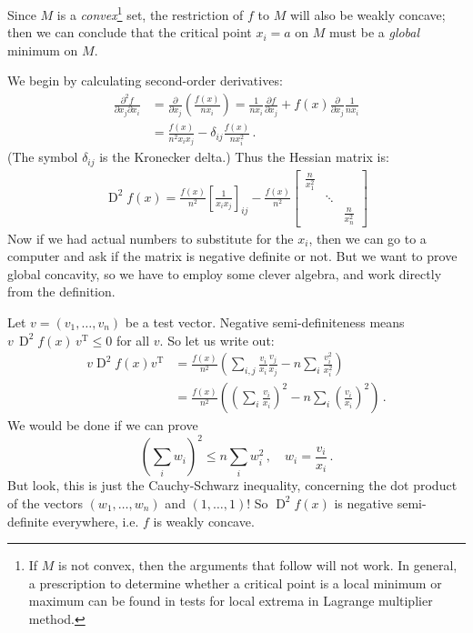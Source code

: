 \documentclass[12pt]{article}
\DeclareMathOperator{\D}{D}
\begin{document}
Since $M$ is a \emph{convex}\footnote{
If $M$ is not convex, then the arguments that follow will not work.
In general, a prescription to determine whether a critical point
is a local minimum or maximum can be found
in tests for local extrema in Lagrange multiplier method.} set, the restriction
of $f$ to $M$ will also be weakly concave;
then we can conclude that
the critical point $x_i = a$ on $M$
must be a \emph{global} minimum on $M$.

We begin by calculating second-order derivatives:
\begin{align*}
\frac{\partial^2 f}{\partial x_j \partial x_i} &= \frac{\partial}{\partial x_j} \left( \frac{f(x)}{nx_i} \right) 
=
\frac{1}{nx_i} \frac{\partial f}{\partial x_j} + f(x) \frac{\partial}{\partial x_j} \frac{1}{nx_i} \\
&= \frac{f(x)}{n^2 x_i x_j} - \delta_{ij} \frac{f(x)}{n x_i^2}\,.
\end{align*}
(The symbol $\delta_{ij}$ is the Kronecker delta.)
Thus the Hessian matrix is:
\begin{align*}
\D^2 f(x) = \frac{f(x)}{n^2} \left[ \frac{1}{x_i x_j} \right]_{ij} - \frac{f(x)}{n^2} 
\begin{bmatrix}
\frac{n}{x_1^2} \\
& \ddots \\
& & \frac{n}{x_n^2}
\end{bmatrix}
\end{align*}
Now if we had actual numbers to substitute for the $x_i$,
then we can go to a computer and ask if the matrix is negative definite or not.
But we want to prove global concavity, so we have to employ some clever
algebra, and work directly from the definition.

Let $v = (v_1, \dotsc, v_n)$ be a test vector.
Negative semi-definiteness means $v \, \D^2 f(x) \, v^{\mathrm{T}} \leq 0$ for all $v$.
So let us write out:
\begin{align*}
v \D^2 f(x) v^{\mathrm{T}} &= \frac{f(x)}{n^2} \left( \sum_{i,j} \frac{v_i}{x_i} \frac{v_j}{x_j} - n \sum_i \frac{v_i^2}{x_i^2} \right) \\
&= \frac{f(x)}{n^2} \left( \left( \sum_i \frac{v_i}{x_i} \right)^2 - n \sum_i \left(\frac{v_i}{x_i}\right)^2 \right)\,.
\end{align*}
We would be done if we can prove
\begin{equation}\label{cauchy}
\left( \sum_i w_i \right)^2 \leq n \sum_i w_i^2\,, \quad w_i = \frac{v_i}{x_i}\,.
\end{equation}
But look, this is just the Cauchy-Schwarz inequality,
concerning the dot product of the vectors $(w_1, \dotsc, w_n)$
and $(1, \dotsc, 1)$!  
So $\D^2 f(x)$ is negative semi-definite everywhere,
i.e. $f$ is weakly concave.
\end{document}
